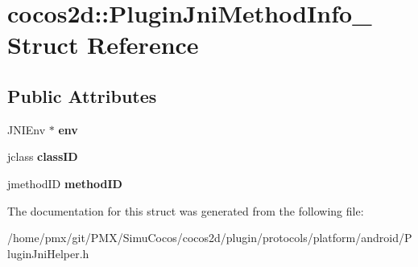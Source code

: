 \hypertarget{structcocos2d_1_1PluginJniMethodInfo__}{}\section{cocos2d\+:\+:Plugin\+Jni\+Method\+Info\+\_\+ Struct Reference}
\label{structcocos2d_1_1PluginJniMethodInfo__}
\subsection*{Public Attributes}
\begin{DoxyCompactItemize}
\item 
\mbox{\label{structcocos2d_1_1PluginJniMethodInfo___ad3c7ab7dbd5c1c75988fdb3e964c79cb}} 
J\+N\+I\+Env $\ast$ {\bfseries env}
\item 
\mbox{\label{structcocos2d_1_1PluginJniMethodInfo___a70a8c6f26a1755efe97f46c06ef47dee}} 
jclass {\bfseries class\+ID}
\item 
\mbox{\label{structcocos2d_1_1PluginJniMethodInfo___a8097fb3d3c8373c9f96a59aff7a138d7}} 
jmethod\+ID {\bfseries method\+ID}
\end{DoxyCompactItemize}


The documentation for this struct was generated from the following file\+:\begin{DoxyCompactItemize}
\item 
/home/pmx/git/\+P\+M\+X/\+Simu\+Cocos/cocos2d/plugin/protocols/platform/android/Plugin\+Jni\+Helper.\+h\end{DoxyCompactItemize}
